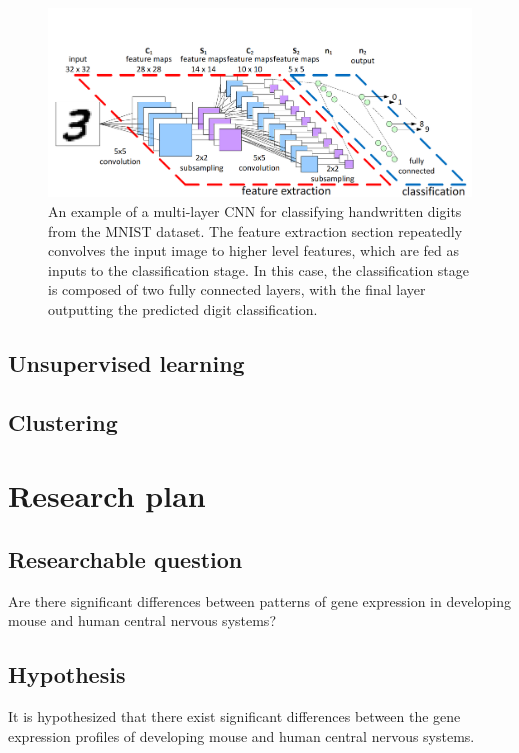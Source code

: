 \documentclass[12pt,oneside,onecolumn,a4paper]{article}
\begin{document}
\begin{figure}[h!]
\begin{center}
\includegraphics[width=0.7\columnwidth]{figures/CNN/CNN}
\caption{An example of a multi-layer CNN for classifying handwritten digits from the MNIST dataset. The feature extraction section repeatedly convolves the input image to higher level features, which are fed as inputs to the classification stage. In this case, the classification stage is composed of two fully connected layers, with the final layer outputting the predicted digit classification. \citep{peemen_mesman_corporaal_2011}%
}
\end{center}
\end{figure}

\subsection{Unsupervised learning}


\subsection{Clustering}
\citep{yangCVPR2016joint}

\section{Research plan}


\subsection{Researchable question}
Are there significant differences between patterns of gene expression in developing mouse and human central nervous systems?

\subsection{Hypothesis}

It is hypothesized that there exist significant differences between the gene expression profiles of developing mouse and human central nervous systems.
\end{document}
